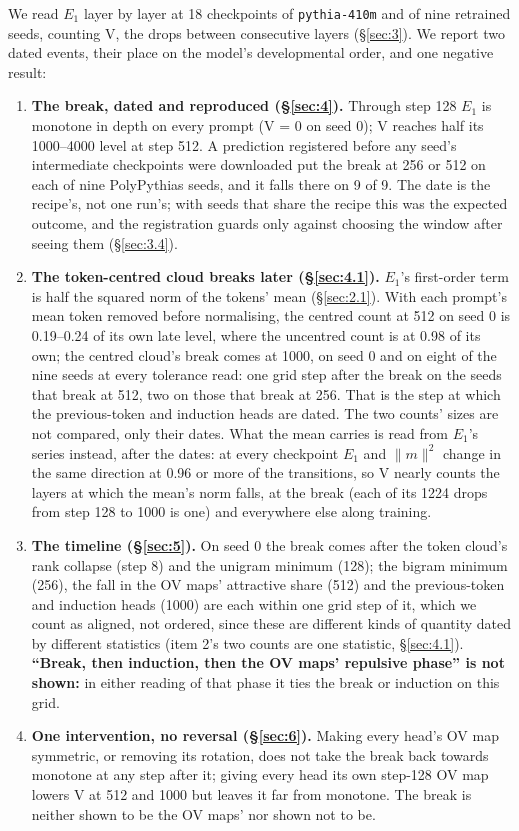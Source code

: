 \documentclass[11pt]{article}
\begin{document}
We read $E_{1}$ layer by layer at 18 checkpoints of \texttt{pythia-410m} and of nine retrained seeds, counting V, the drops between consecutive layers (\S\ref{sec:3}). We report two dated events, their place on the model's developmental order, and one negative result:

\begin{enumerate}
  \item \textbf{The break, dated and reproduced (\S\ref{sec:4}).} Through step 128 $E_{1}$ is monotone in depth on every prompt (V = 0 on seed 0); V reaches half its 1000--4000 level at step 512. A prediction registered before any seed's intermediate checkpoints were downloaded put the break at 256 or 512 on each of nine PolyPythias seeds, and it falls there on 9 of 9. The date is the recipe's, not one run's; with seeds that share the recipe this was the expected outcome, and the registration guards only against choosing the window after seeing them (\S\ref{sec:3.4}).
  \item \textbf{The token-centred cloud breaks later (\S\ref{sec:4.1}).} $E_{1}$'s first-order term is half the squared norm of the tokens' mean (\S\ref{sec:2.1}). With each prompt's mean token removed before normalising, the centred count at 512 on seed 0 is 0.19--0.24 of its own late level, where the uncentred count is at 0.98 of its own; the centred cloud's break comes at 1000, on seed 0 and on eight of the nine seeds at every tolerance read: one grid step after the break on the seeds that break at 512, two on those that break at 256. That is the step at which the previous-token and induction heads are dated. The two counts' sizes are not compared, only their dates. What the mean carries is read from $E_{1}$'s series instead, after the dates: at every checkpoint $E_{1}$ and $\|m\|^{2}$ change in the same direction at 0.96 or more of the transitions, so V nearly counts the layers at which the mean's norm falls, at the break (each of its 1224 drops from step 128 to 1000 is one) and everywhere else along training.
  \item \textbf{The timeline (\S\ref{sec:5}).} On seed 0 the break comes after the token cloud's rank collapse (step 8) and the unigram minimum (128); the bigram minimum (256), the fall in the OV maps' attractive share (512) and the previous-token and induction heads (1000) are each within one grid step of it, which we count as aligned, not ordered, since these are different kinds of quantity dated by different statistics (item 2's two counts are one statistic, \S\ref{sec:4.1}). \textbf{``Break, then induction, then the OV maps' repulsive phase'' is not shown:} in either reading of that phase it ties the break or induction on this grid.
  \item \textbf{One intervention, no reversal (\S\ref{sec:6}).} Making every head's OV map symmetric, or removing its rotation, does not take the break back towards monotone at any step after it; giving every head its own step-128 OV map lowers V at 512 and 1000 but leaves it far from monotone. The break is neither shown to be the OV maps' nor shown not to be.
\end{enumerate}
\end{document}
